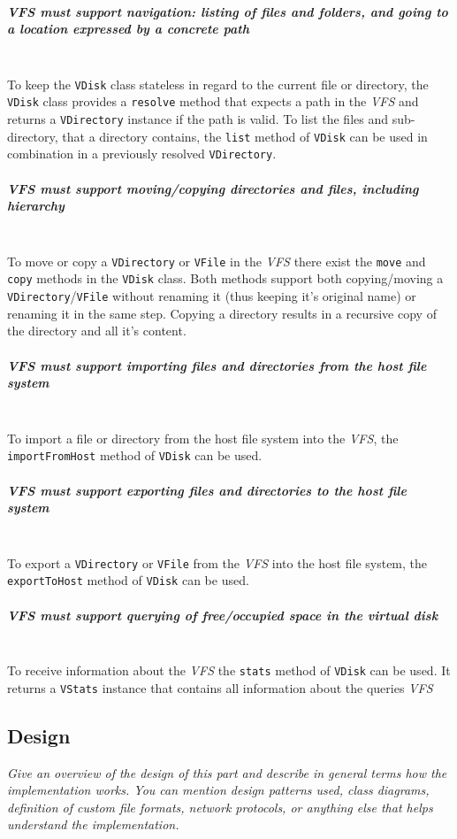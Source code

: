 \documentclass[a4paper,12pt]{article}
\begin{document}
\subparagraph{\emph{VFS} must support navigation: listing of files and folders, and going to a location expressed by a concrete path} \hfill\\
To keep the \texttt{VDisk} class stateless in regard to the current file or directory, the \texttt{VDisk} class provides a \texttt{resolve} method that expects a path in the \emph{VFS} and returns a \texttt{VDirectory} instance if the path is valid. To list the files and sub-directory, that a directory contains, the \texttt{list} method of \texttt{VDisk} can be used in combination in a previously resolved \texttt{VDirectory}.

\subparagraph{\emph{VFS} must support moving/copying directories and files, including hierarchy} \hfill\\
To move or copy a \texttt{VDirectory} or \texttt{VFile} in the \emph{VFS} there exist the \texttt{move} and \texttt{copy} methods in the \texttt{VDisk} class. Both methods support both copying/moving a \texttt{VDirectory}/\texttt{VFile} without renaming it (thus keeping it's original name) or renaming it in the same step. Copying a directory results in a recursive copy of the directory and all it's content.

\subparagraph{\emph{VFS} must support importing files and directories from the host file system} \hfill\\
To import a file or directory from the host file system into the \emph{VFS}, the \texttt{importFromHost} method of \texttt{VDisk} can be used.

\subparagraph{\emph{VFS} must support exporting files and directories to the host file system} \hfill\\
To export a \texttt{VDirectory} or \texttt{VFile} from the \emph{VFS} into the host file system, the \texttt{exportToHost} method of \texttt{VDisk} can be used.

\subparagraph{\emph{VFS} must support querying of free/occupied space in the virtual disk} \hfill\\
To receive information about the \emph{VFS} the \texttt{stats} method of \texttt{VDisk} can be used. It returns a \texttt{VStats} instance that contains all information about the queries \emph{VFS}

\subsection{Design}

\emph{Give an overview of the design of this part and describe in general terms how the implementation works. You can mention design patterns used, class diagrams, definition of custom file formats, network protocols, or anything else that helps understand the implementation.}
\end{document}
